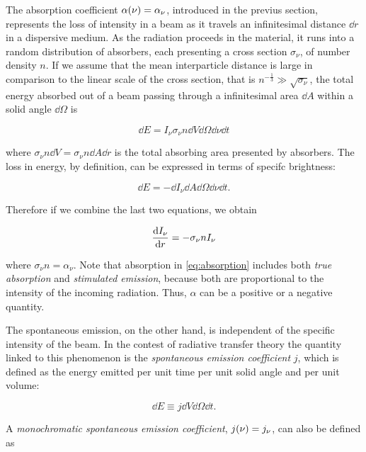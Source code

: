 The absorption coefficient $\alpha\qty(\nu) = \alpha_\nu$, introduced in the
previus section, represents the loss of intensity in a beam as it travels an
infinitesimal distance $\dd{r}$ in a dispersive medium. As the radiation
proceeds in the material, it runs into a random distribution of absorbers,
each presenting a cross section $\sigma_\nu$, of number density $n$. If we
assume that the mean interparticle distance is large in comparison to the
linear scale of the cross section, that is $n^{-\frac{1}{3}} \gg
\sqrt{\sigma_\nu}$, the total energy absorbed out of a beam passing
through a infinitesimal area $\dd{A}$ within a solid angle $\dd{\Omega}$ is

\begin{equation}
        \dd{E} = I_\nu \sigma_\nu n \dd{V} \dd{\Omega} \dd{\nu} \dd{t}
\end{equation}

where $\sigma_\nu n \dd{V} = \sigma_\nu n \dd{A} \dd{r}$ is the total
absorbing area presented by absorbers. The loss in energy, by definition,
can be expressed in terms of specifc brightness:

\begin{equation}
        \dd{E} = -\dd{I_\nu} \dd{A} \dd{\Omega} \dd{\nu} \dd{t}.
\end{equation}

Therefore if we combine the last two equations, we obtain

\begin{equation}
        \dv{I_\nu}{r} = -\sigma_\nu n I_\nu
        \label{eq:absorption}
\end{equation}

where $\sigma_\nu n = \alpha_\nu$. Note that absorption in
\autoref{eq:absorption} includes both \emph{true absorption} and
\emph{stimulated emission}, because both are proportional to the intensity
of the incoming radiation. Thus, $\alpha$ can be a positive or a negative
quantity.

The spontaneous emission, on the other hand, is independent of the
specific intensity of the beam. In the contest of radiative transfer theory
the quantity linked to this phenomenon is the \emph{spontaneous emission
coefficient} $j$, which is defined as the energy emitted
per unit time per unit solid angle and per unit volume:

\begin{equation}
        \dd{E} \equiv j\dd{V}\dd{\Omega}\dd{t}.
\end{equation}

A \emph{monochromatic spontaneous emission coefficient}, $j\qty(\nu) =
j_\nu$, can also be defined as

